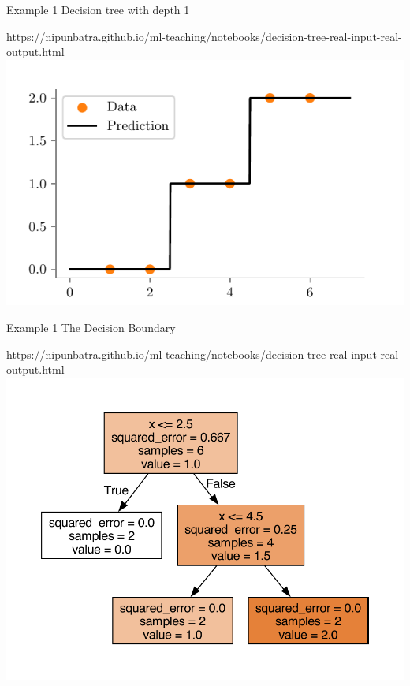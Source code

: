 \documentclass[usenames,dvipsnames]{beamer}
\begin{document}
\begin{frame}{Example 1}
	Decision tree with depth 1
	\begin{center}
		\begin{notebookbox}{https://nipunbatra.github.io/ml-teaching/notebooks/decision-tree-real-input-real-output.html}
			\includegraphics{../assets/decision-trees/figures/ri-ro-depth-2.pdf}
		\end{notebookbox}
	\end{center}
	\end{frame}
	
	\begin{frame}{Example 1}
	The Decision Boundary
	\begin{center}
		\begin{notebookbox}{https://nipunbatra.github.io/ml-teaching/notebooks/decision-tree-real-input-real-output.html}
			\includegraphics[scale=0.6]{../assets/decision-trees/figures/ri-ro-depth-2-sklearn.pdf}
		\end{notebookbox}
	\end{center}
	\end{frame}
	
\end{document}

